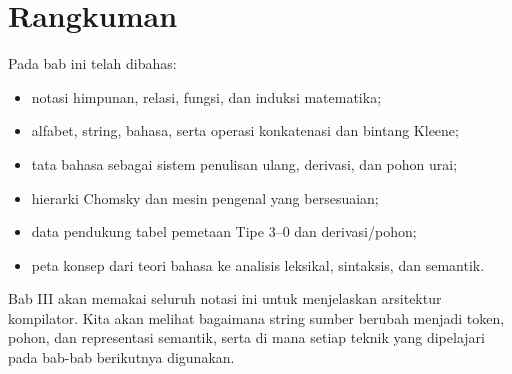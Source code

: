 \section*{Rangkuman}

Pada bab ini telah dibahas:
\begin{itemize}[leftmargin=*]
  \item notasi himpunan, relasi, fungsi, dan induksi matematika;
  \item alfabet, string, bahasa, serta operasi konkatenasi dan
        bintang Kleene;
  \item tata bahasa sebagai sistem penulisan ulang, derivasi, dan
        pohon urai;
  \item hierarki Chomsky dan mesin pengenal yang bersesuaian;
  \item data pendukung tabel pemetaan Tipe 3--0 dan derivasi/pohon;
  \item peta konsep dari teori bahasa ke analisis leksikal,
        sintaksis, dan semantik.
\end{itemize}

Bab III akan memakai seluruh notasi ini untuk menjelaskan arsitektur
kompilator. Kita akan melihat bagaimana string sumber berubah menjadi
token, pohon, dan representasi semantik, serta di mana setiap teknik
yang dipelajari pada bab-bab berikutnya digunakan.
